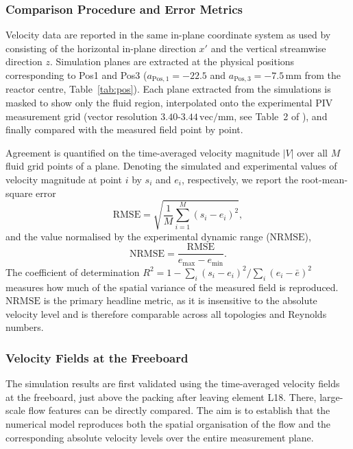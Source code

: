 \subsubsection{Comparison Procedure and Error Metrics}
\label{sec:validation:procedure}

Velocity data are reported in the same in-plane coordinate system as used by~\cite{velten2026} consisting of the horizontal in-plane direction $x'$ and the vertical streamwise direction $z$. Simulation planes are extracted at the physical positions corresponding to Pos1 and Pos3 ($a_{\mathrm{Pos},1} = -22.5$ and $a_{\mathrm{Pos},3} = -7.5\,\mathrm{mm}$ from the reactor centre, Table~\ref{tab:pos}). Each plane extracted from the simulations is masked to show only the fluid region, interpolated onto the experimental PIV measurement grid (vector resolution $3.40$-$3.44\,\mathrm{vec/mm}$, see Table~2 of \cite{velten2026}), and finally compared with the measured field point by point.

Agreement is quantified on the time-averaged velocity magnitude $|V|$ over all $M$ fluid grid points of a plane. Denoting the simulated and experimental values of velocity magnitude at point $i$ by $s_i$ and $e_i$, respectively, we report the root-mean-square error
\begin{equation}
    \mathrm{RMSE} = \sqrt{\frac{1}{M}\sum_{i=1}^{M}\left(s_i-e_i\right)^2},
\end{equation}
and the value normalised by the experimental dynamic range ($\mathrm{NRMSE}$),
\begin{equation}
\mathrm{NRMSE} = \frac{\mathrm{RMSE}}{e_\mathrm{max}-e_\mathrm{min}}.
    \label{eq:rmse}
\end{equation}
The coefficient of determination $R^2 = 1-\sum_i(s_i-e_i)^2/\sum_i(e_i-\bar{e})^2$ measures how much of the spatial variance of the measured field is reproduced. $\mathrm{NRMSE}$ is the primary headline metric, as it is insensitive to the absolute velocity level and is therefore comparable across all topologies and Reynolds numbers.

\subsubsection{Velocity Fields at the Freeboard}
\label{sec:validation:surface}

The simulation results are first validated using the time-averaged velocity fields at the freeboard, just above the packing after leaving element L18. There, large-scale flow features can be directly compared. The aim is to establish that the numerical model reproduces both the spatial organisation of the flow and the corresponding absolute velocity levels over the entire measurement plane.

